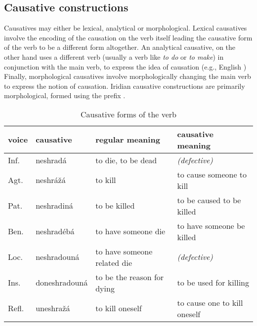 \subsection{Causative constructions}

Causatives may either be lexical, analytical or morphological. Lexical causatives involve the encoding of the causation on the verb itself leading the causative form of the verb to be a different form altogether. An analytical causative, on the other hand uses a different verb (usually a verb like \emph{to do} or \emph{to make}) in conjunction with the main verb, to express the idea of causation (e.g., English ) Finally, morphological causatives involve morphologically changing the main verb to express the notion of causation. Iridian causative constructions are primarily morphological, formed using the prefix .

\begin{table}
\footnotesize\sffamily
\caption{Causative forms of the verb }
\medskip
	\label{tbl:causative}
    \begin{tabu}to 
        \toprule
		 		{\sc voice}& {\sc causative } &{\sc regular meaning} & {\sc causative meaning}\\
		\midrule
				Inf.				& neshradá									& to die, to be dead 	& \emph{(defective)} \\ 
		 		Agt.				& {neshrážá}			& to kill & to cause someone to kill\\ 
		 		Pat.			& {neshradiná}					& to be killed & to be caused to be killed\\
				Ben.			& {neshradébá}				& to have someone die	& to have someone be killed\\
				Loc.				& {neshradouná}					& to have someone related die&\emph{(defective)}\\
				Ins.		& {doneshradouná}&to be the reason for dying&to be used for killing\\
				Refl.				& {uneshražá}&to kill oneself&to cause one to kill oneself\\
		 		
				\bottomrule

    \end{tabu}

\end{table}

